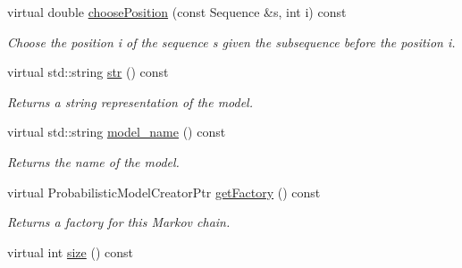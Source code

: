 \begin{DoxyCompactItemize}
\mbox{\label{classtops_1_1VariableLengthMarkovChain_a21a2ae230ad1f1b4dca462a2ecce96b8}} 
virtual double \hyperlink{classtops_1_1VariableLengthMarkovChain_a21a2ae230ad1f1b4dca462a2ecce96b8}{choose\+Position} (const Sequence \&s, int i) const
\begin{DoxyCompactList}\small\item\em Choose the position i of the sequence s given the subsequence before the position i. \end{DoxyCompactList}\item 
\mbox{\label{classtops_1_1VariableLengthMarkovChain_a6cea8f8a5d6029c84ead5a20e3c40c3e}} 
virtual std\+::string \hyperlink{classtops_1_1VariableLengthMarkovChain_a6cea8f8a5d6029c84ead5a20e3c40c3e}{str} () const
\begin{DoxyCompactList}\small\item\em Returns a string representation of the model. \end{DoxyCompactList}\item 
\mbox{\label{classtops_1_1VariableLengthMarkovChain_a1284f770379b44f4e1d0c74eb59977c3}} 
virtual std\+::string \hyperlink{classtops_1_1VariableLengthMarkovChain_a1284f770379b44f4e1d0c74eb59977c3}{model\+\_\+name} () const
\begin{DoxyCompactList}\small\item\em Returns the name of the model. \end{DoxyCompactList}\item 
\mbox{\label{classtops_1_1VariableLengthMarkovChain_a3d2787274bcec6a96ed8b463e5392cc9}} 
virtual Probabilistic\+Model\+Creator\+Ptr \hyperlink{classtops_1_1VariableLengthMarkovChain_a3d2787274bcec6a96ed8b463e5392cc9}{get\+Factory} () const
\begin{DoxyCompactList}\small\item\em Returns a factory for this Markov chain. \end{DoxyCompactList}\item 
\mbox{\label{classtops_1_1VariableLengthMarkovChain_aae30762edc5aa22615c7467494de11c5}} 
virtual int \hyperlink{classtops_1_1VariableLengthMarkovChain_aae30762edc5aa22615c7467494de11c5}{size} () const

\end{DoxyCompactItemize}
